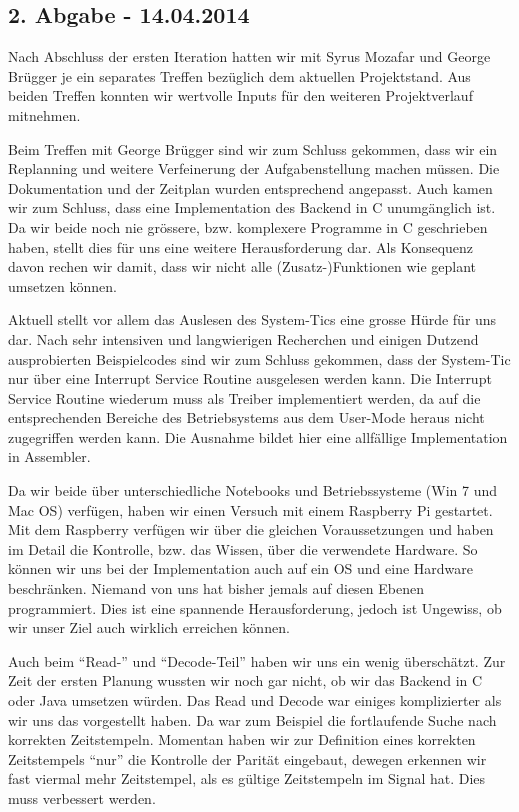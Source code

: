 \subsection{2. Abgabe - 14.04.2014}
Nach Abschluss der ersten Iteration hatten wir mit Syrus Mozafar und George Brügger je ein separates Treffen bezüglich dem aktuellen Projektstand. Aus beiden Treffen konnten wir wertvolle Inputs für den weiteren Projektverlauf mitnehmen. 

Beim Treffen mit George Brügger sind wir zum Schluss gekommen, dass wir ein Replanning und weitere Verfeinerung der Aufgabenstellung machen müssen. Die Dokumentation und der Zeitplan wurden entsprechend angepasst. Auch kamen wir zum Schluss, dass eine Implementation des Backend in C unumgänglich ist. Da wir beide noch nie grössere, bzw. komplexere Programme in C geschrieben haben, stellt dies für uns eine weitere Herausforderung dar. Als Konsequenz davon rechen wir damit, dass wir nicht alle (Zusatz-)Funktionen wie geplant umsetzen können.

Aktuell stellt vor allem das Auslesen des System-Tics eine grosse Hürde für uns dar. Nach sehr intensiven und langwierigen Recherchen und einigen Dutzend ausprobierten Beispielcodes sind wir zum Schluss gekommen, dass der System-Tic nur über eine Interrupt Service Routine ausgelesen werden kann. Die Interrupt Service Routine wiederum muss als Treiber implementiert werden, da auf die entsprechenden Bereiche des Betriebsystems aus dem User-Mode heraus nicht zugegriffen werden kann. Die Ausnahme bildet hier eine allfällige Implementation in Assembler.

Da wir beide über unterschiedliche Notebooks und Betriebssysteme (Win 7 und Mac OS) verfügen, haben wir einen Versuch mit einem Raspberry Pi gestartet. Mit dem Raspberry verfügen wir über die gleichen Voraussetzungen und haben im Detail die Kontrolle, bzw. das Wissen, über die verwendete Hardware. So können wir uns bei der Implementation auch auf ein OS und eine Hardware beschränken. Niemand von uns hat bisher jemals auf diesen Ebenen programmiert. Dies ist eine spannende Herausforderung, jedoch ist Ungewiss, ob wir unser Ziel auch wirklich erreichen können.

Auch beim "`Read-"' und "`Decode-Teil"' haben wir uns ein wenig überschätzt. Zur Zeit der ersten Planung wussten wir noch gar nicht, ob wir das Backend in C oder Java umsetzen würden.
Das Read und Decode war einiges komplizierter als wir uns das vorgestellt haben. Da war zum Beispiel die fortlaufende Suche nach korrekten Zeitstempeln. Momentan haben wir zur Definition eines korrekten Zeitstempels "`nur"' die Kontrolle der Parität eingebaut, dewegen erkennen wir fast viermal mehr Zeitstempel, als es gültige Zeitstempeln im Signal hat. Dies muss verbessert werden.


